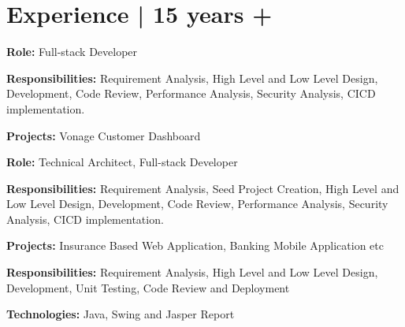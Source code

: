 \documentclass[]{deedy-resume-openfont}
\begin{document}
\hfill
\begin{minipage}[t]{0.66\textwidth} 


\section{Experience | 15 years +}
\vspace{\topsep}
\begin{tightemize}
\item \textbf{Role:} Full-stack Developer
\item \textbf{Responsibilities:} Requirement Analysis, High Level and Low Level Design, Development, Code Review, Performance Analysis, Security Analysis, CICD implementation. 
\item \textbf{Projects:} Vonage Customer Dashboard
\end{tightemize}
\sectionsep

\vspace{\topsep}
\begin{tightemize}
\item \textbf{Role:} Technical Architect, Full-stack Developer
\item \textbf{Responsibilities:} Requirement Analysis, Seed Project Creation, High Level and Low Level Design, Development, Code Review, Performance Analysis, Security Analysis, CICD implementation. 
\item \textbf{Projects:} Insurance Based Web Application, Banking Mobile Application etc
\end{tightemize}
\sectionsep

\vspace{\topsep}
\begin{tightemize}
\item \textbf{Responsibilities:} Requirement Analysis, High Level and Low Level Design, Development, Unit Testing, Code Review and Deployment
\end{tightemize}
\sectionsep

\vspace{\topsep}
\begin{tightemize}
\item \textbf {Technologies:} Java, Swing and Jasper Report
\end{tightemize}
\sectionsep


\end{minipage}
\end{document}

